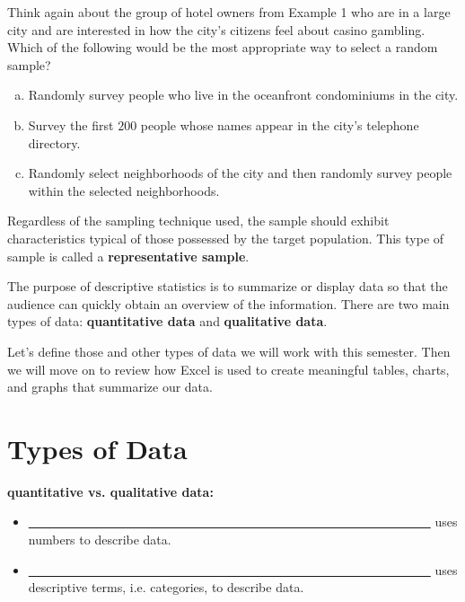\documentclass[12pt, letterpaper]{article}
\newcounter{exercise}
\theoremstyle{definition}
\begin{document}
\begin{exercise}  Think again about the group of hotel owners from Example 1 who are in a large city and are interested in how the city's citizens feel about casino gambling.  Which of the following would be the most appropriate way to select a random sample?

\begin{enumerate}[(a)]
\item Randomly survey people who live in the oceanfront condominiums in the city.
\item Survey the first $200$ people whose names appear in the city's telephone directory.
\item Randomly select neighborhoods of the city and then randomly survey people within the selected neighborhoods.
\end{enumerate}

\end{exercise}

\vfill


\begin{tcolorbox}
Regardless of the sampling technique used, the sample should exhibit characteristics typical of those possessed by the target population.  This type of sample is called a \textbf{representative sample}.
\end{tcolorbox}



\begin{statement}
The purpose of descriptive statistics is to summarize or display data so that the audience can quickly obtain an overview of the information.  There are two main types of data:  \textbf{quantitative data} and \textbf{qualitative data}.

Let's define those and other types of data we will work with this semester.  Then we will move on to review how Excel is used to create meaningful tables, charts, and graphs that summarize our data.
\end{statement}

\section*{Types of Data}

\begin{defn}
\textbf{quantitative vs. qualitative data:}
\vspace*{.3in}

\begin{itemize}

\item \underline{~~~~~~~~~~~~~~~~~~~~~~~~~~~~~~~~~~~~~~~~~~~~~~~~~~~~~~~~~~~~~~~~} uses numbers to describe data.
\vspace*{.3in}

\item \underline{~~~~~~~~~~~~~~~~~~~~~~~~~~~~~~~~~~~~~~~~~~~~~~~~~~~~~~~~~~~~~~~~} uses descriptive terms, i.e. categories, to describe data.
\vspace*{.3in}

\end{itemize}
\end{defn}
\end{document}
